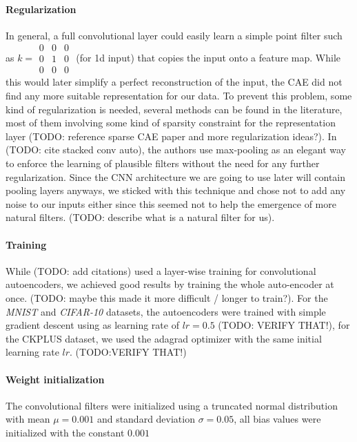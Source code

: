 \documentclass{article}
\begin{document}
    \paragraph{Regularization} In general, a full convolutional layer could easily learn a simple point filter such as $k = \begin{smallmatrix} 0&0&0\\ 0&1&0 \\ 0&0&0 \end{smallmatrix}$ (for 1d input) that copies the input onto a feature map. While this would later simplify a perfect reconstruction of the input, the CAE did not find any more suitable representation for our data. To prevent this problem, some kind of regularization is needed, several methods can be found in the literature, most of them involving some kind of sparsity constraint for the representation layer (TODO: reference sparse CAE paper and more regularization ideas?). In (TODO: cite stacked conv auto), the authors use max-pooling as an elegant way to enforce the learning of plausible filters without the need for any further regularization. Since the CNN architecture we are going to use later will contain pooling layers anyways, we sticked with this technique and chose not to add any noise to our inputs either since this seemed not to help the emergence of more natural filters. (TODO: describe what is a natural filter for us). 

    \paragraph{Training} While (TODO: add citations) used a layer-wise training for convolutional autoencoders, we achieved good results by training the whole auto-encoder at once. (TODO: maybe this made it more difficult / longer to train?). For the \emph{MNIST} and \emph{CIFAR-10} datasets, the autoencoders were trained with simple gradient descent using as learning rate of $lr = 0.5$ (TODO: VERIFY THAT!), for the CKPLUS dataset, we used the adagrad optimizer with the same initial learning rate $lr$. (TODO:VERIFY THAT!)


    \paragraph{Weight initialization} The convolutional filters were initialized using a truncated normal distribution with mean $\mu = 0.001$ and standard deviation $\sigma = 0.05$, all bias values were initialized with the constant $0.001$
\end{document}
